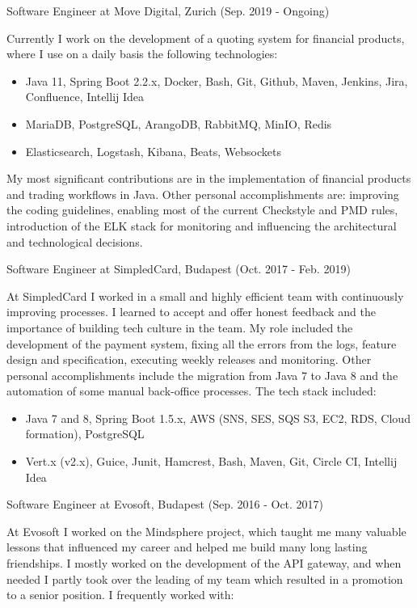 \documentclass[hidelinks,11pt]{friggeri-cv}
\newenvironment{experience}{\begin{adjustwidth}{-4.6cm}{}}{\end{adjustwidth}}
\begin{document}
\begin{experience}

{\LARGE Software Engineer at Move Digital, Zurich (Sep. 2019 - Ongoing)}

Currently I work on the development of a quoting system for financial products, where I use on a daily basis the following technologies:

\begin{itemize}
  \item Java 11, Spring Boot 2.2.x, Docker, Bash, Git, Github, Maven, Jenkins, Jira, Confluence, Intellij Idea
  \item MariaDB, PostgreSQL, ArangoDB, RabbitMQ, MinIO, Redis
  \item Elasticsearch, Logstash, Kibana, Beats, Websockets
\end{itemize}

My most significant contributions are in the implementation of financial products and trading workflows in Java.
Other personal accomplishments are: improving the coding guidelines, enabling most of the current Checkstyle and PMD rules, introduction of the ELK stack for monitoring and influencing the architectural and technological decisions.

{\LARGE Software Engineer at SimpledCard, Budapest (Oct. 2017 - Feb. 2019)}

At SimpledCard I worked in a small and highly efficient team with continuously improving processes.
I learned to accept and offer honest feedback and the importance of building tech culture in the team.
My role included the development of the payment system, fixing all the errors from the logs, feature design and specification, executing weekly releases and monitoring.
Other personal accomplishments include the migration from Java 7 to Java 8 and the automation of some manual back-office processes. The tech stack included:

\begin{itemize}
  \item Java 7 and 8, Spring Boot 1.5.x, AWS (SNS, SES, SQS S3, EC2, RDS, Cloud formation), PostgreSQL
  \item Vert.x (v2.x), Guice, Junit, Hamcrest, Bash, Maven, Git, Circle CI, Intellij Idea
\end{itemize}

{\LARGE Software Engineer at Evosoft, Budapest (Sep. 2016 - Oct. 2017)}

At Evosoft I worked on the Mindsphere project, which taught me many valuable lessons that influenced my career and helped me build many long lasting friendships.
I mostly worked on the development of the API gateway, and when needed I partly took over the leading of my team which resulted in a promotion to a senior position.
I frequently worked with:


\end{experience}
\end{document}
